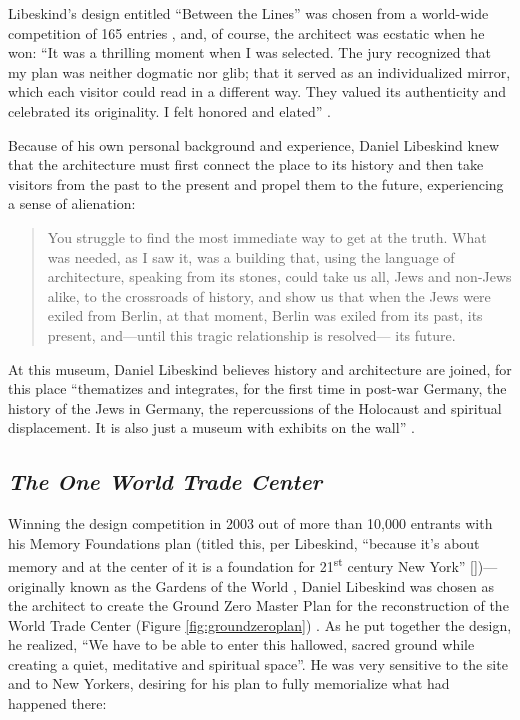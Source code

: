 Libeskind’s design entitled “Between the Lines” was chosen from a
world-wide competition of 165 entries \citep{levenson2005}, and, of course, the
architect was ecstatic when he won: “It was a thrilling moment when I
was selected.  The jury recognized that my plan was neither dogmatic
nor glib; that it served as an individualized mirror, which each
visitor could read in a different way.  They valued its authenticity
and celebrated its originality. I felt honored and elated” \citep[][p.~85]{libeskind2004}.

Because of his own personal background and experience, Daniel Libeskind
knew that the architecture must first connect the place to its history
and then take visitors from the past to the present and propel them to
the future, experiencing a sense of alienation: 

\begin{quote}
You struggle to find the most immediate way to get at the truth.  What
was needed, as I saw it, was a building that, using the language of
architecture, speaking from its stones, could take us all, Jews and
non-Jews alike, to the crossroads of history, and show us that when the
Jews were exiled from Berlin, at that moment, Berlin was exiled from
its past, its present, and—until this tragic relationship is resolved—
its future.  \citep[][p.~83]{libeskind2004}
\end{quote}

At this museum, Daniel
Libeskind believes history and architecture are joined, for this place
``thematizes and integrates, for the first time in
post-war Germany, the history of the Jews in Germany, the repercussions
of the Holocaust and spiritual displacement.  It is also just a museum
with exhibits on the wall'' \citep{muellerkroll2011}.

\subsection{\textit{The One World Trade Center}}


Winning the design competition in 2003 out of more than 10,000
entrants with his Memory Foundations plan (titled this, per Libeskind, “because it’s
about memory and at the center of it is a foundation for
21\textsuperscript{st} century New York” [\citealp{nessen2011}])—originally known as the Gardens of the World \citep{hirschkorn2003, swanson2011, ny1news2003}, Daniel Libeskind was chosen as the
architect to create the Ground Zero Master Plan for the reconstruction
of the World Trade Center (Figure \ref{fig:groundzeroplan}) \citep{libeskind2011}.  As he put
together the design, he realized, ``We have to be able to
enter this hallowed, sacred ground while creating a quiet, meditative
and spiritual space''\citep{libeskind2012}.  He was very
sensitive to the site and to New Yorkers, desiring for his plan to
fully memorialize what had happened there: 

